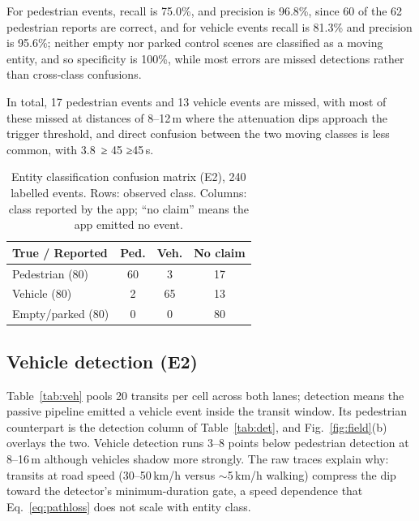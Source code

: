 \documentclass[conference,10pt]{IEEEtran}
\begin{document}
For pedestrian events, recall is 75.0\%, and precision is 96.8\%, since 60 of the 62 pedestrian reports are correct, and for vehicle events recall is 81.3\% and precision is 95.6\%; neither empty nor parked control scenes are classified as a moving entity, and so specificity is 100\%, while most errors are missed detections rather than cross‑class confusions.

In total, 17 pedestrian events and 13 vehicle events are missed, with most of these missed at distances of 8--12 m where the attenuation dips approach the trigger threshold, and direct confusion between the two moving classes is less common, with 3.8 %
≥
45
≥45 s.

\begin{table}[t]
\centering
\caption{Entity classification confusion matrix (E2), 240 labelled events. Rows:
observed class. Columns: class reported by the app; ``no claim'' means the
app emitted no event.}
\label{tab:conf}
\footnotesize
\begin{tabular}{@{}lccc@{}}
\toprule
\textbf{True / Reported} & \textbf{Ped.} & \textbf{Veh.} & \textbf{No claim} \\
\midrule
Pedestrian (80)   & 60 & 3  & 17 \\
Vehicle (80)      & 2  & 65 & 13 \\
Empty/parked (80) & 0  & 0  & 80 \\
\bottomrule
\end{tabular}
\end{table}

\subsection{Vehicle detection (E2)}
Table~\ref{tab:veh} pools 20 transits per cell across both lanes; detection
means the passive pipeline emitted a vehicle event inside the transit
window. Its pedestrian counterpart is the detection column of
Table~\ref{tab:det}, and Fig.~\ref{fig:field}(b) overlays the two. Vehicle detection runs 3--8 points below pedestrian detection at
8--16\,m although vehicles shadow more strongly. The raw traces explain why:
transits at road speed (30--50\,km/h versus $\sim$5\,km/h walking) compress
the dip toward the detector's minimum-duration gate, a speed dependence that
Eq.~\eqref{eq:pathloss} does not scale with entity class.
\end{document}
